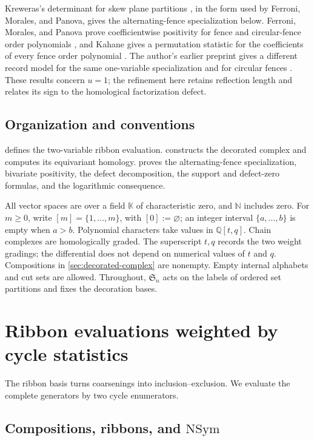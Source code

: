 \documentclass{amsart}
\theoremstyle{definition}
\theoremstyle{remark}
\newcommand{\kk}{\mathbb{K}}
\newcommand{\QQ}{\mathbb{Q}}
\begin{document}
Kreweras's determinant for skew plane partitions \cite{Kreweras1965}, in the
form used by Ferroni, Morales, and Panova, gives the alternating-fence
specialization below.  Ferroni, Morales, and Panova prove coefficientwise
positivity for fence and circular-fence order polynomials
\cite{FerroniMoralesPanova}, and Kahane gives a permutation statistic for the
coefficients of every fence order polynomial
\cite[Theorem~3.8]{KahaneFenceCoefficients}.  The author's earlier preprint
gives a different record model for the same one-variable specialization and
for circular fences \cite{HuangGreedyRecords2026}.  These results concern
$u=1$; the refinement here retains reflection length and relates its sign to
the homological factorization defect.

\subsection*{Organization and conventions}

 defines the two-variable ribbon evaluation.
 constructs the decorated complex and computes its
equivariant homology.   proves the
alternating-fence specialization, bivariate positivity, the defect
decomposition, the support and defect-zero formulas, and the logarithmic
consequence.

All vector spaces are over a field $\kk$ of characteristic zero, and
$\mathbb N$ includes zero.  For $m\geq0$, write $[m]=\{1,\ldots,m\}$, with
$[0]:=\varnothing$; an integer interval $\{a,\ldots,b\}$ is empty when
$a>b$.  Polynomial characters take values in $\QQ[t,q]$.  Chain complexes
are homologically graded.  The superscript $t,q$ records the two weight
gradings; the differential does not depend on numerical values of $t$ and
$q$.  Compositions in \cref{sec:decorated-complex} are nonempty.  Empty
internal alphabets and cut sets are allowed.  Throughout, $\mathfrak S_n$
acts on the labels of ordered set partitions and fixes the decoration bases.

\section{Ribbon evaluations weighted by cycle statistics}
\label{sec:characters}

The ribbon basis turns coarsenings into inclusion--exclusion.  We evaluate
the complete generators by two cycle enumerators.

\subsection{Compositions, ribbons, and \texorpdfstring{\(\mathrm{NSym}\)}{NSym}}
\end{document}
